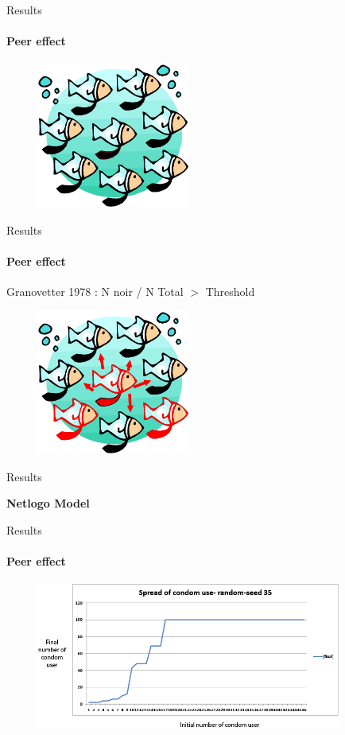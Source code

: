 \documentclass{beamer}
\begin{document}
\begin{frame}{Results}
\framesubtitle{\bf{Peer effect}}
	\begin{figure}[H]
		\centering
		\includegraphics[width=5.0cm, heigth=5.cm]{./img/peereffect2.png}
	\end{figure} 
\end{frame}

\begin{frame}{Results}
	\framesubtitle{\bf{Peer effect}}
	Granovetter 1978 : N noir / N Total $>$ Threshold
	\begin{figure}[H]
		\centering
		\includegraphics[width=5.0cm, heigth=5.cm]{./img/peereffect3.png}
	\end{figure} 
\end{frame}

\begin{frame}{Results}
	\begin{center}
		\bf{Netlogo Model}
	\end{center}
\end{frame}

\begin{frame}{Results}
\framesubtitle{\bf{Peer effect}}
	\begin{figure}[H]
		\centering
		\includegraphics[width=10.0cm]{./img/Spreadcondom.png}
	\end{figure} 
\end{frame}
\end{document}
